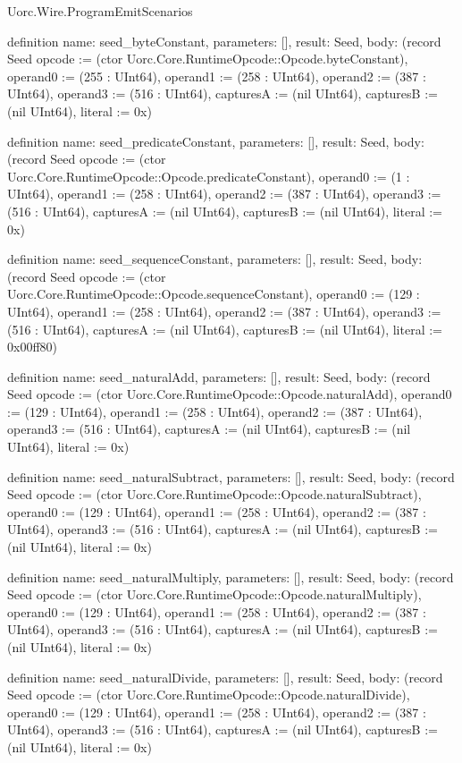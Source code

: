 \begin{lexlean}{Uorc.Wire.ProgramEmitScenarios}
\begin{semanticmodule}
definition{
  name: seed_byteConstant,
  parameters: [],
  result: Seed,
  body: (record Seed {opcode := (ctor Uorc.Core.RuntimeOpcode::Opcode.byteConstant), operand0 := (255 : UInt64), operand1 := (258 : UInt64), operand2 := (387 : UInt64), operand3 := (516 : UInt64), capturesA := (nil UInt64), capturesB := (nil UInt64), literal := 0x})
}

definition{
  name: seed_predicateConstant,
  parameters: [],
  result: Seed,
  body: (record Seed {opcode := (ctor Uorc.Core.RuntimeOpcode::Opcode.predicateConstant), operand0 := (1 : UInt64), operand1 := (258 : UInt64), operand2 := (387 : UInt64), operand3 := (516 : UInt64), capturesA := (nil UInt64), capturesB := (nil UInt64), literal := 0x})
}

definition{
  name: seed_sequenceConstant,
  parameters: [],
  result: Seed,
  body: (record Seed {opcode := (ctor Uorc.Core.RuntimeOpcode::Opcode.sequenceConstant), operand0 := (129 : UInt64), operand1 := (258 : UInt64), operand2 := (387 : UInt64), operand3 := (516 : UInt64), capturesA := (nil UInt64), capturesB := (nil UInt64), literal := 0x00ff80})
}

definition{
  name: seed_naturalAdd,
  parameters: [],
  result: Seed,
  body: (record Seed {opcode := (ctor Uorc.Core.RuntimeOpcode::Opcode.naturalAdd), operand0 := (129 : UInt64), operand1 := (258 : UInt64), operand2 := (387 : UInt64), operand3 := (516 : UInt64), capturesA := (nil UInt64), capturesB := (nil UInt64), literal := 0x})
}

definition{
  name: seed_naturalSubtract,
  parameters: [],
  result: Seed,
  body: (record Seed {opcode := (ctor Uorc.Core.RuntimeOpcode::Opcode.naturalSubtract), operand0 := (129 : UInt64), operand1 := (258 : UInt64), operand2 := (387 : UInt64), operand3 := (516 : UInt64), capturesA := (nil UInt64), capturesB := (nil UInt64), literal := 0x})
}

definition{
  name: seed_naturalMultiply,
  parameters: [],
  result: Seed,
  body: (record Seed {opcode := (ctor Uorc.Core.RuntimeOpcode::Opcode.naturalMultiply), operand0 := (129 : UInt64), operand1 := (258 : UInt64), operand2 := (387 : UInt64), operand3 := (516 : UInt64), capturesA := (nil UInt64), capturesB := (nil UInt64), literal := 0x})
}

definition{
  name: seed_naturalDivide,
  parameters: [],
  result: Seed,
  body: (record Seed {opcode := (ctor Uorc.Core.RuntimeOpcode::Opcode.naturalDivide), operand0 := (129 : UInt64), operand1 := (258 : UInt64), operand2 := (387 : UInt64), operand3 := (516 : UInt64), capturesA := (nil UInt64), capturesB := (nil UInt64), literal := 0x})
}


\end{semanticmodule}
\end{lexlean}

